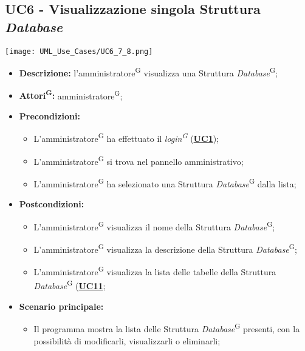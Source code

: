 \subsection{UC6 - Visualizzazione singola Struttura \textit{Database}}
\label{sec:UC6}
\texttt{[image: UML\_Use\_Cases/UC6\_7\_8.png]}
\begin{itemize}
	\item \textbf{Descrizione:} l’amministratore\textsuperscript{G} visualizza una Struttura \textit{Database}\textsuperscript{G};
	\item \textbf{Attori\textsuperscript{G}:} amministratore\textsuperscript{G};
	\item \textbf{Precondizioni:} 
	\begin{itemize}
		\item L’amministratore\textsuperscript{G} ha effettuato il \textit{login\textsuperscript{G}} (\hyperref[sec:UC1]{\textbf{UC1}});
		\item L’amministratore\textsuperscript{G} si trova nel pannello amministrativo;
		\item L'amministratore\textsuperscript{G} ha selezionato una Struttura \textit{Database}\textsuperscript{G} dalla lista;
	\end{itemize}
	\item \textbf{Postcondizioni:} 
	\begin{itemize}
		\item L'amministratore\textsuperscript{G} visualizza il nome della Struttura \textit{Database}\textsuperscript{G};
		\item L'amministratore\textsuperscript{G} visualizza la descrizione della Struttura \textit{Database}\textsuperscript{G};
		\item L'amministratore\textsuperscript{G} visualizza la lista delle tabelle della Struttura \textit{Database}\textsuperscript{G}  (\hyperref[sec:UC11]{\textbf{UC11}};
	\end{itemize}
	\item \textbf{Scenario principale:} 
	\begin{itemize}
		\item Il programma mostra la lista delle Struttura \textit{Database}\textsuperscript{G} presenti, con la possibilità di modificarli, visualizzarli o eliminarli;
	\end{itemize}
\end{itemize}


